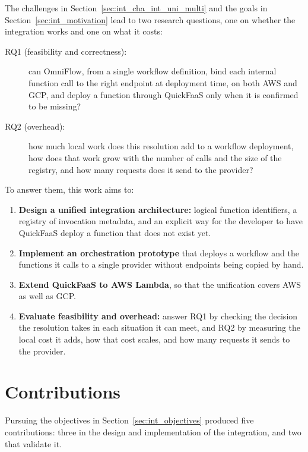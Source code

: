 The challenges in Section~\ref{sec:int_cha_int_uni_multi} and the goals in
Section~\ref{sec:int_motivation} lead to two research questions, one on whether the integration
works and one on what it costs:

\begin{description}
	\item[RQ1 (feasibility and correctness):] can OmniFlow, from a single workflow definition, bind
	each internal function call to the right endpoint at deployment time, on both AWS and GCP, and
	deploy a function through QuickFaaS only when it is confirmed to be missing?
	\item[RQ2 (overhead):] how much local work does this resolution add to a workflow deployment,
	how does that work grow with the number of calls and the size of the registry, and how many
	requests does it send to the provider?
\end{description}

To answer them, this work aims to:

\begin{enumerate}
	\item \textbf{Design a unified integration architecture:} logical function identifiers, a
	registry of invocation metadata, and an explicit way for the developer to have QuickFaaS deploy
	a function that does not exist yet.
	\item \textbf{Implement an orchestration prototype} that deploys a workflow and the functions it
	calls to a single provider without endpoints being copied by hand.
	\item \textbf{Extend QuickFaaS to AWS Lambda}, so that the unification covers AWS as well as
	GCP.
	\item \textbf{Evaluate feasibility and overhead:} answer RQ1 by checking the decision the
	resolution takes in each situation it can meet, and RQ2 by measuring the local cost it adds,
	how that cost scales, and how many requests it sends to the provider.
\end{enumerate}

\section{Contributions}
\label{sec:int_contributions}

Pursuing the objectives in Section~\ref{sec:int_objectives} produced five contributions: three
in the design and implementation of the integration, and two that validate it.

